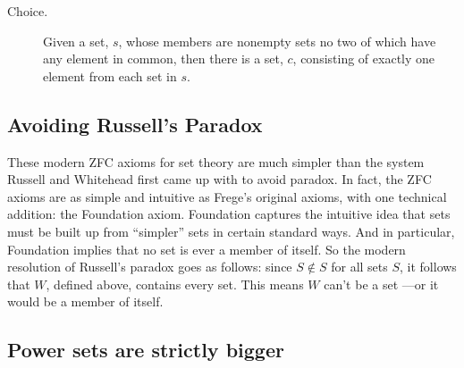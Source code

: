 \begin{description}
\item[Choice.]  Given a set, $s$, whose members are nonempty sets no two
  of which have any element in common, then there is a set, $c$,
  consisting of exactly one element from each set in $s$.

\iffalse
\begin{tabbing}
$\exists y \, \forall z \, \forall w \,
 \biggl( ($\=$z \in w \,\QAND\, w \in x) \; \QIMPLIES $\\
\> $\exists v \, \exists u \, \Bigl(\exists t \, \bigr((u \in w \, \QAND \, w \in t)$\=$\;\QAND\; (u \in t \,\QAND\, t \in y)\bigl) $\\
\> \> $\QIFF\; u = v\Bigr) \biggr)$
\end{tabbing}

\[\begin{array}{rlll}
\exists y \forall z \forall w & ( (z \in w \QAND w \in x) \QIMPLIES\\
                              &\quad \exists v \exists u (\exists t
                                           ((u \in w \QAND & w \in t)
                                                              & \QAND (u \in t \QAND t \in y))\\
                                                            &&& \QIFF u = v))
\end{array}\]
\fi

\end{description}


\subsection{Avoiding Russell's Paradox}

These modern ZFC axioms for set theory are much simpler than the system
Russell and Whitehead first came up with to avoid paradox.  In fact, the
ZFC axioms are as simple and intuitive as Frege's original axioms, with
one technical addition: the Foundation axiom.  Foundation captures the
intuitive idea that sets must be built up from ``simpler'' sets in certain
standard ways.  And in particular, Foundation implies that no set is ever
a member of itself.  So the modern resolution of Russell's paradox goes as
follows: since $S \not \in S$ for all sets $S$, it follows that $W$,
defined above, contains every set.  This means $W$ can't be a set ---or it
would be a member of itself.

\subsection{Power sets are strictly bigger}


